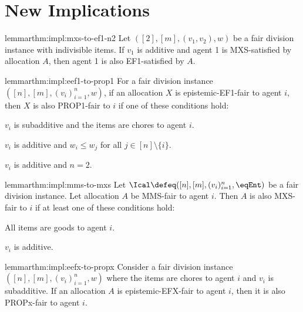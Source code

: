 \section{New Implications}
\label{sec:new-impls}

\begin{restatable}[MXS$\implies$EF1 for $n=2$]{lemma}{rthm:impl:mxs-to-ef1-n2}
\label{thm:impl:mxs-to-ef1-n2}
Let $([2], [m], (v_1, v_2), w)$ be a fair division instance with indivisible items.
If $v_1$ is additive and agent 1 is MXS-satisfied by allocation $A$,
then agent 1 is also EF1-satisfied by $A$.
\end{restatable}

\begin{restatable}{lemma}{rthm:impl:eef1-to-prop1}
\label{thm:impl:eef1-to-prop1}
For a fair division instance $([n], [m], (v_i)_{i=1}^n, w)$,
if an allocation $X$ is epistemic-EF1-fair to agent $i$, then $X$ is also PROP1-fair to $i$
if one of these conditions hold:
\begin{tightenum}
\item $v_i$ is subadditive and the items are chores to agent $i$.
\item $v_i$ is additive and $w_i \le w_j$ for all $j \in [n] \setminus \{i\}$.
\item $v_i$ is additive and $n=2$.
\end{tightenum}
\end{restatable}

\begin{restatable}{lemma}{rthm:impl:mms-to-mxs}
\label{thm:impl:mms-to-mxs}
Let $\Ical \defeq ([n], [m], (v_i)_{i=1}^n, \eqEnt)$ be a fair division instance.
Let allocation $A$ be MMS-fair to agent $i$.
Then $A$ is also MXS-fair to $i$ if at least one of these conditions hold:
\begin{tightenum}
\item All items are goods to agent $i$.
\item $v_i$ is additive.
\end{tightenum}
\end{restatable}

\begin{restatable}{lemma}{rthm:impl:eefx-to-propx}
\label{thm:impl:eefx-to-propx}
Consider a fair division instance $([n], [m], (v_i)_{i=1}^n, w)$ where
the items are chores to agent $i$ and $v_i$ is subadditive.
If an allocation $A$ is epistemic-EFX-fair to agent $i$,
then it is also PROPx-fair to agent $i$.
\end{restatable}

